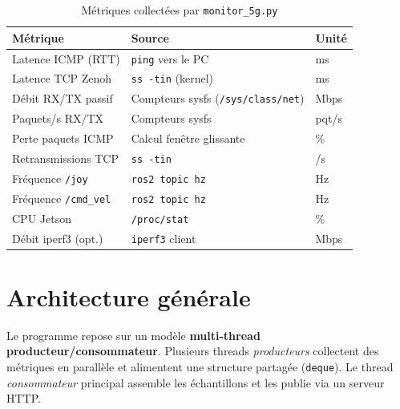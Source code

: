 \documentclass[a4paper,12pt]{article}
\begin{document}
\begin{table}[H]
\centering
\begin{tabular}{lll}
\toprule
\textbf{Métrique} & \textbf{Source} & \textbf{Unité} \\
\midrule
Latence ICMP (RTT) & \texttt{ping} vers le PC & ms \\
Latence TCP Zenoh  & \texttt{ss -tin} (kernel) & ms \\
Débit RX/TX passif & Compteurs sysfs (\texttt{/sys/class/net}) & Mbps \\
Paquets/s RX/TX    & Compteurs sysfs & pqt/s \\
Perte paquets ICMP & Calcul fenêtre glissante & \% \\
Retransmissions TCP & \texttt{ss -tin} & /s \\
Fréquence \texttt{/joy} & \texttt{ros2 topic hz} & Hz \\
Fréquence \texttt{/cmd\_vel} & \texttt{ros2 topic hz} & Hz \\
CPU Jetson & \texttt{/proc/stat} & \% \\
Débit iperf3 (opt.) & \texttt{iperf3} client & Mbps \\
\bottomrule
\end{tabular}
\caption{Métriques collectées par \texttt{monitor\_5g.py}}
\end{table}

\section{Architecture générale}

Le programme repose sur un modèle \textbf{multi-thread producteur/consommateur}.
Plusieurs threads \emph{producteurs} collectent des métriques en parallèle et alimentent
une structure partagée (\texttt{deque}). Le thread \emph{consommateur} principal assemble
les échantillons et les publie via un serveur HTTP.
\end{document}
